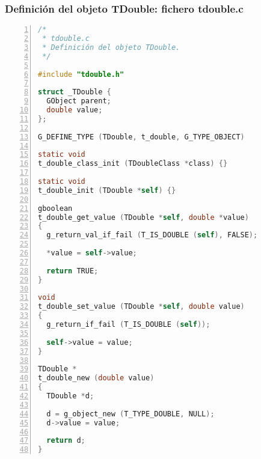 \subsubsection{Definición del objeto \textsf{TDouble}: fichero \textsf{tdouble.c}}

\begin{lstlisting}[language=C, numbers=left]
/*
 * tdouble.c
 * Definición del objeto TDouble.
 */
 
#include "tdouble.h"

struct _TDouble {
  GObject parent;
  double value;
};

G_DEFINE_TYPE (TDouble, t_double, G_TYPE_OBJECT)

static void
t_double_class_init (TDoubleClass *class) {}

static void
t_double_init (TDouble *self) {}

gboolean
t_double_get_value (TDouble *self, double *value)
{
  g_return_val_if_fail (T_IS_DOUBLE (self), FALSE);

  *value = self->value;
  
  return TRUE;
}

void
t_double_set_value (TDouble *self, double value)
{
  g_return_if_fail (T_IS_DOUBLE (self));

  self->value = value;
}

TDouble *
t_double_new (double value)
{
  TDouble *d;

  d = g_object_new (T_TYPE_DOUBLE, NULL);
  d->value = value;
  
  return d;
}
 \end{lstlisting}

